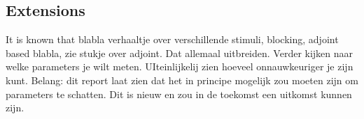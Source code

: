 \documentclass{article}
\begin{document}
\subsection{Extensions} \label{Extensions}
It is known that blabla verhaaltje over verschillende stimuli, blocking, adjoint based blabla, zie stukje over adjoint. Dat allemaal uitbreiden. Verder kijken naar welke parameters je wilt meten. UIteinlijkelij zien hoeveel onnauwkeuriger je zijn kunt. Belang: dit report laat zien dat het in principe mogelijk zou moeten zijn om parameters te schatten. Dit is nieuw en zou in de toekomst een uitkomst kunnen zijn.


%
\end{document}
